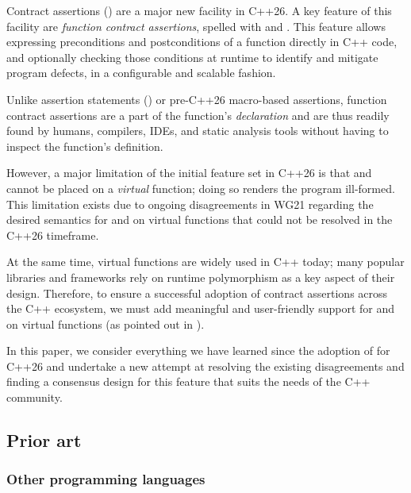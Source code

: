 Contract assertions (\cite{P2900R14}) are a major new facility in C++26. A key feature of this facility are \emph{function contract assertions}, spelled with  and . This feature allows expressing
preconditions and postconditions of a function directly in C++ code, and optionally checking those conditions at runtime to identify and mitigate program defects, in a configurable and scalable fashion. 

Unlike assertion statements () or pre-C++26 macro-based assertions, function contract assertions are a part of the function's \emph{declaration} and are thus readily found by humans, compilers, IDEs, and static analysis tools without having to inspect the function's definition. 

However, a major limitation of the initial feature set in C++26 is that  and  cannot be placed on a \emph{virtual} function; doing so renders the program ill-formed. This limitation exists due to ongoing disagreements in WG21 regarding the desired semantics for  and  on virtual functions that could not be resolved in the C++26 timeframe.

At the same time, virtual functions are widely used in C++ today; many popular libraries and frameworks rely on runtime polymorphism as a key aspect of their design. Therefore, to ensure a successful adoption of contract assertions across the C++ ecosystem, we must add meaningful and user-friendly support for  and  on virtual functions (as pointed out in \cite{P3173R0}).

In this paper, we consider everything we have learned since the adoption of \cite{P2900R14} for C++26 and undertake a new attempt at resolving the existing disagreements and finding a consensus design for this feature that suits the needs of the C++ community.

\subsection{Prior art}

\subsubsection{Other programming languages}


